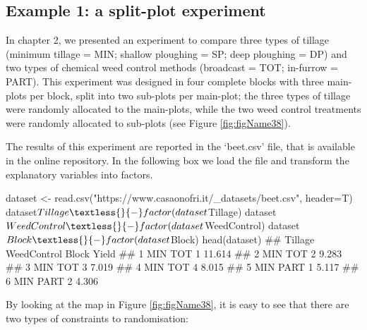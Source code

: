 \documentclass[a4paper,12pt,oneside]{book}
\newenvironment{Shaded}{\begin{snugshade}}{\end{snugshade}}
\newcommand{\SpecialCharTok}[1]{#1}
\newcommand{\StringTok}[1]{#1}
\newcommand{\DocumentationTok}[1]{#1}
\newcommand{\OtherTok}[1]{#1}
\newcommand{\FunctionTok}[1]{#1}
\newcommand{\AttributeTok}[1]{#1}
\newcommand{\NormalTok}[1]{#1}
\begin{document}
\hypertarget{example-1-a-split-plot-experiment}{%
\subsection{Example 1: a split-plot experiment}\label{example-1-a-split-plot-experiment}}

In chapter 2, we presented an experiment to compare three types of tillage (minimum tillage = MIN; shallow ploughing = SP; deep ploughing = DP) and two types of chemical weed control methods (broadcast = TOT; in-furrow = PART). This experiment was designed in four complete blocks with three main-plots per block, split into two sub-plots per main-plot; the three types of tillage were randomly allocated to the main-plots, while the two weed control treatments were randomly allocated to sub-plots (see Figure \ref{fig:figName38}).

The results of this experiment are reported in the `beet.csv' file, that is available in the online repository. In the following box we load the file and transform the explanatory variables into factors.

\begin{Shaded}
\begin{Highlighting}[]
\NormalTok{dataset }\OtherTok{\textless{}{-}} \FunctionTok{read.csv}\NormalTok{(}\StringTok{"https://www.casaonofri.it/\_datasets/beet.csv"}\NormalTok{, }\AttributeTok{header=}\NormalTok{T)}
\NormalTok{dataset}\SpecialCharTok{$}\NormalTok{Tillage }\OtherTok{\textless{}{-}} \FunctionTok{factor}\NormalTok{(dataset}\SpecialCharTok{$}\NormalTok{Tillage)}
\NormalTok{dataset}\SpecialCharTok{$}\NormalTok{WeedControl }\OtherTok{\textless{}{-}} \FunctionTok{factor}\NormalTok{(dataset}\SpecialCharTok{$}\NormalTok{WeedControl)}
\NormalTok{dataset}\SpecialCharTok{$}\NormalTok{Block }\OtherTok{\textless{}{-}} \FunctionTok{factor}\NormalTok{(dataset}\SpecialCharTok{$}\NormalTok{Block)}
\FunctionTok{head}\NormalTok{(dataset)}
\DocumentationTok{\#\#   Tillage WeedControl Block  Yield}
\DocumentationTok{\#\# 1     MIN         TOT     1 11.614}
\DocumentationTok{\#\# 2     MIN         TOT     2  9.283}
\DocumentationTok{\#\# 3     MIN         TOT     3  7.019}
\DocumentationTok{\#\# 4     MIN         TOT     4  8.015}
\DocumentationTok{\#\# 5     MIN        PART     1  5.117}
\DocumentationTok{\#\# 6     MIN        PART     2  4.306}
\end{Highlighting}
\end{Shaded}

By looking at the map in Figure \ref{fig:figName38}, it is easy to see that there are two types of constraints to randomisation:
\end{document}
